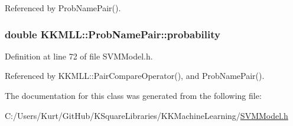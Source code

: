 Referenced by Prob\+Name\+Pair().

\subsubsection[{\texorpdfstring{probability}{probability}}]{\setlength{\rightskip}{0pt plus 5cm}double K\+K\+M\+L\+L\+::\+Prob\+Name\+Pair\+::probability}\hypertarget{class_k_k_m_l_l_1_1_prob_name_pair_ad80cd8e0d4b96ddeed6791d72b19d4a5}{}\label{class_k_k_m_l_l_1_1_prob_name_pair_ad80cd8e0d4b96ddeed6791d72b19d4a5}


Definition at line 72 of file S\+V\+M\+Model.\+h.



Referenced by K\+K\+M\+L\+L\+::\+Pair\+Compare\+Operator(), and Prob\+Name\+Pair().



The documentation for this class was generated from the following file\+:\begin{DoxyCompactItemize}
\item 
C\+:/\+Users/\+Kurt/\+Git\+Hub/\+K\+Square\+Libraries/\+K\+K\+Machine\+Learning/\hyperlink{_s_v_m_model_8h}{S\+V\+M\+Model.\+h}\end{DoxyCompactItemize}
